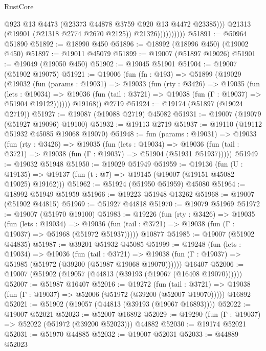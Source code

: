 \begin{lexlean}{RustCore}
\begin{coremodule}
                            @923
                            @13
                            @4473
                            (@23373 @44878 @3759 @920 @13 @4472 @23385)))
                        @21313
                        (@19901 (@21318 @2774 @2670 @2125))
                        @21326))))))))))
@51891 := @50964 @51890
@51892 := @18990 @450
@51896 := @18992 (@18996 @450) (@19002 @450)
@51897 := @19011 @45079
@51899 := @19007 (@51897 @19026)
@51901 := @19049 (@19050 @450)
@51902 := @19045 @51901
@51904 := @19007 (@51902 @19075)
@51921 := @19006
    (fun (fn : @193) =>
    @51899
      (@19029
        (@19032
          (fun (params : @19031) =>
          @19033
            (fun (rty : @3426) =>
            @19035
              (fun (lets : @19034) =>
              @19036 (fun (tail : @3721) => @19038 (fun (Γ : @19037) => @51904 @19122))))))
        @19168))
    @2719
@51924 := @19174 (@51897 (@19024 @2719))
@51927 := @19087 (@19088 @2719) @45082
@51931 := @19007 (@19079 (@51927 @19096) @19100)
@51932 := @19113 @2719
@51937 := @19110 (@19112 @51932 @45085 @19068 @19070)
@51948 := fun (params : @19031) =>
  @19033
    (fun (rty : @3426) =>
    @19035
      (fun (lets : @19034) =>
      @19036 (fun (tail : @3721) => @19038 (fun (Γ : @19037) => @51904 (@51931 @51937)))))
@51949 := @19032 @51948
@51950 := @19029 @51949
@51959 := @19136
    (fun (U : @19135) => @19137 (fun (t : @7) => @19145 (@19007 (@19151 @45082 @19025) @19162)))
@51962 := @51924 (@51950 @51959) @45080
@51964 := @18992 @51949 @51959
@51966 := @19223 @51948 @13262
@51968 := @19007 (@51902 @44815)
@51969 := @51927 @44818
@51970 := @19079 @51969
@51972 := @19007 (@51970 @19100)
@51983 := @19226
    (fun (rty : @3426) =>
    @19035
      (fun (lets : @19034) =>
      @19036 (fun (tail : @3721) => @19038 (fun (Γ : @19037) => @51968 (@51972 @51937)))))
    @10877
@51985 := @19007 (@51902 @44835)
@51987 := @39201 @51932 @45085
@51999 := @19248
    (fun (lets : @19034) =>
    @19036
      (fun (tail : @3721) =>
      @19038 (fun (Γ : @19037) => @51985 (@51972 (@39200 (@51987 @19068 @19070))))))
    @16407
@52006 := @19007 (@51902 (@19057 (@44813 (@39193 (@19067 (@16408 @19070))))))
@52007 := @51987 @16407
@52016 := @19272
    (fun (tail : @3721) => @19038 (fun (Γ : @19037) => @52006 (@51972 (@39200 (@52007 @19070)))))
    @16892
@52021 := @51902 (@19057 (@44813 (@39193 (@19067 @16893))))
@52022 := @19007 @52021
@52023 := @52007 @16892
@52029 := @19290 (fun (Γ : @19037) => @52022 (@51972 (@39200 @52023))) @44882
@52030 := @19174 @52021
@52031 := @51970 @44885
@52032 := @19007 @52031
@52033 := @44889 @52023

\end{coremodule}
\end{lexlean}
